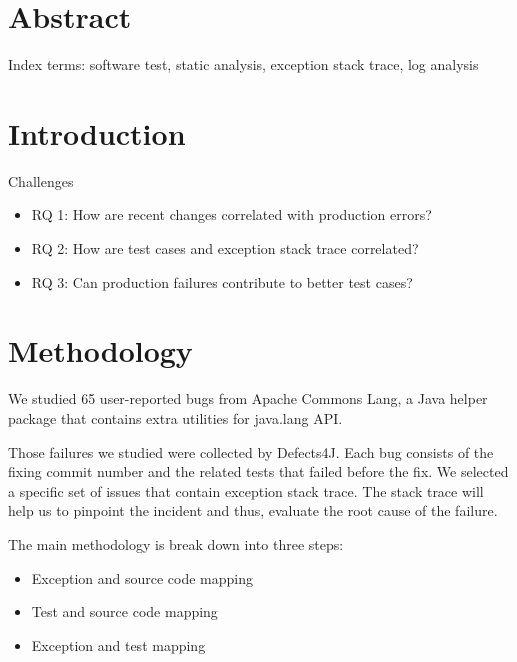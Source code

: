 
\section{Abstract}


Index terms: software test, static analysis, exception stack trace, log analysis

\section{Introduction}

Challenges

\vspace{-0.1cm}
\begin{itemize} \itemsep 0em
 \item RQ 1: How are recent changes correlated with production errors?


 \item RQ 2: How are test cases and exception stack trace correlated?

 
 \item RQ 3: Can production failures contribute to better test cases?

 
\end{itemize}

\section{Methodology}
We studied 65 user-reported bugs from  Apache Commons Lang, a Java helper package that contains extra utilities for java.lang API. 

Those failures we studied were collected by  Defects4J. Each bug consists of the fixing commit number and the related tests that failed before the fix. We selected a specific set of issues that contain exception stack trace. The stack trace will help us to pinpoint the incident and thus, evaluate the root cause of the failure. 

The main methodology is break down into three steps:
\vspace{-0.1cm}
\begin{itemize} \itemsep 0em
 \item Exception and source code mapping
 \item Test and source code mapping
 \item Exception and test mapping
\end{itemize}

